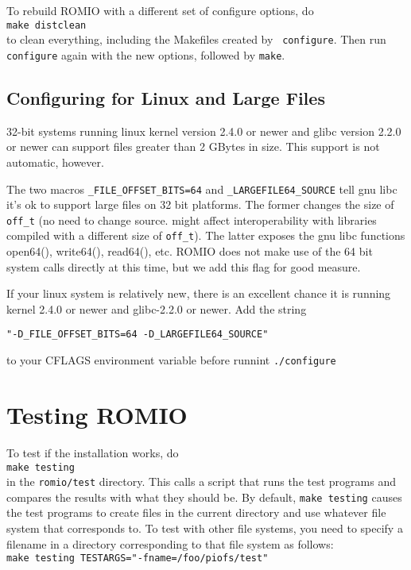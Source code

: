 To rebuild ROMIO with a different set of configure options, do\\
\hspace*{.4in} {\tt make distclean}\\
to clean everything, including the Makefiles created by {\tt
configure}.  Then run {\tt configure} again with the new options,
followed by {\tt make}.

\subsection{Configuring for Linux and Large Files }

32-bit systems running linux kernel version 2.4.0 or newer and glibc
version 2.2.0 or newer can support files greater than 2 GBytes in size.
This support is not automatic, however.  

The two macros {\tt\_FILE\_OFFSET\_BITS=64} and
{\tt\_LARGEFILE64\_SOURCE} tell gnu libc it's ok to support large files
on 32 bit platforms.  The former changes the size of {\tt off\_t} (no
need to change source.  might affect interoperability with libraries
compiled with a different size of {\tt off\_t}).   The latter exposes
the gnu libc functions open64(), write64(), read64(), etc.   ROMIO does
not make use of the 64 bit system calls directly at this time, but we
add this flag for good measure.  

If your linux system is relatively new, there is an excellent chance it
is running kernel 2.4.0 or newer and glibc-2.2.0 or newer.  Add the
string
\begin{verbatim}
"-D_FILE_OFFSET_BITS=64 -D_LARGEFILE64_SOURCE"
\end{verbatim}
to your CFLAGS environment variable before runnint {\tt./configure}

%
%
\section{Testing ROMIO}
To test if the installation works, do\\
\hspace*{.4in} {\tt make testing}\\
in the {\tt romio/test} directory. This calls a script that runs the test
programs and compares the results with what they should be. By
default, {\tt make testing} causes the test programs to create files in
the current directory and use whatever file system that corresponds
to. To test with other file systems, you need to specify a filename in
a directory corresponding to that file system as follows:\\
\hspace*{.4in} {\tt make testing TESTARGS="-fname=/foo/piofs/test"}



